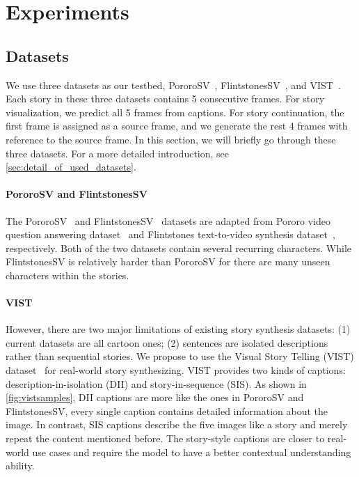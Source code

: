 \documentclass[10pt,twocolumn,letterpaper]{article}
\begin{document}
\section{Experiments}
\subsection{Datasets}
We use three datasets as our testbed, PororoSV~\cite{storygan}, FlintstonesSV~\cite{vlcstorygan}, and VIST~\cite{vist}. Each story in these three datasets contains 5 consecutive frames. For story visualization, we predict all 5 frames from captions. For story continuation, the first frame is assigned as a source frame, and we generate the rest 4 frames with reference to the source frame. In this section, we will briefly go through these three datasets. For a more detailed introduction, see \cref{sec:detail_of_used_datasets}.

\paragraph{PororoSV and FlintstonesSV}
The PororoSV~\cite{storygan} and FlintstonesSV~\cite{vlcstorygan} datasets are adapted from Pororo video question answering dataset~\cite{pororo} and Flintstones text-to-video synthesis dataset~\cite{flintstones}, respectively. Both of the two datasets contain several recurring characters. While FlintstonesSV is relatively harder than PororoSV for there are many unseen characters within the stories.

\paragraph{VIST}
However, there are two major limitations of existing story synthesis datasets: (1) current datasets are all cartoon ones; (2) sentences are isolated descriptions rather than sequential stories. We propose to use the Visual Story Telling (VIST) dataset~\cite{vist} for real-world story synthesizing. VIST provides two kinds of captions: description-in-isolation (DII) and story-in-sequence (SIS). As shown in \cref{fig:vistsamples}, DII captions are more like the ones in PororoSV and FlintstonesSV, every single caption contains detailed information about the image. In contrast, SIS captions describe the five images like a story and merely repeat the content mentioned before. The story-style captions are closer to real-world use cases and require the model to have a better contextual understanding ability.
\end{document}
